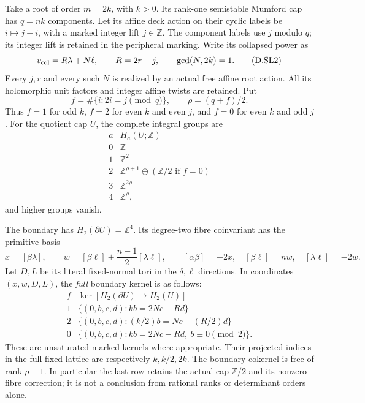 \begin{theorem}
Take a root of order $m=2k$, with $k>0$. Its rank-one
semistable Mumford cap has $q=nk$ components. Let its affine
deck action on their cyclic labels be
$i\mapsto j-i$, with a marked integer lift $j\in\mathbb Z$.
The component labels use $j$ modulo $q$; its integer lift is
retained in the peripheral marking. Write its collapsed
power as
\[
 v_{\rm col}=R\lambda+N\ell,\qquad R=2r-j,
                \qquad \gcd(N,2k)=1 .                     \tag{D.SL2}\label{maps:eq:D.SL2}
\]
Every $j,r$ and every such $N$ is realized by an actual free
affine root action. All its holomorphic unit factors and
integer affine twists are retained. Put
\[
 f=\#\{i:2i=j\pmod q\},\qquad \rho=(q+f)/2.
\]
Thus $f=1$ for odd $k$, $f=2$ for even $k$ and even $j$,
and $f=0$ for even $k$ and odd $j$.
For the quotient cap $U$, the complete integral groups are
\[
\begin{array}{c|c}
a&H_a(U;\mathbb Z)\\\hline
0&\mathbb Z\\
1&\mathbb Z^2\\
2&\mathbb Z^{\rho+1}\oplus
                    (\mathbb Z/2\text{ if }f=0)\\
3&\mathbb Z^{2\rho}\\
4&\mathbb Z^\rho,
\end{array}                                                \tag{D.SL3}\label{maps:eq:D.SL3}
\]
and higher groups vanish.

The boundary has $H_2(\partial U)=\mathbb Z^4$. Its
degree-two fibre coinvariant has the primitive basis
\[
 x=[\beta\lambda],\qquad
 w=[\beta\ell]+\frac{n-1}{2}[\lambda\ell],\qquad
 [\alpha\beta]=-2x,\quad [\beta\ell]=nw,\quad
 [\lambda\ell]=-2w.                                     \tag{D.SL4}\label{maps:eq:D.SL4}
\]
Let $D,L$ be its literal fixed-normal tori in the
$\delta,\ell$ directions. In coordinates $(x,w,D,L)$,
the \emph{full} boundary kernel is as follows:
\[
\begin{array}{c|c}
f&\ker[H_2(\partial U)\longrightarrow H_2(U)]\\\hline
1&\{(0,b,c,d):kb=2Nc-Rd\}\\
2&\{(0,b,c,d):(k/2)b=Nc-(R/2)d\}\\
0&\{(0,b,c,d):kb=2Nc-Rd,\ b\equiv0\pmod2\}.
\end{array}                                                \tag{D.SL5}\label{maps:eq:D.SL5}
\]
These are unsaturated marked kernels where appropriate.
Their projected indices in the full fixed lattice are
respectively $k,k/2,2k$. The boundary cokernel is free of
rank $\rho-1$. In particular the last row retains the
actual cap $\mathbb Z/2$ and its nonzero fibre correction;
it is not a conclusion from rational ranks or determinant
orders alone.


\end{theorem}
